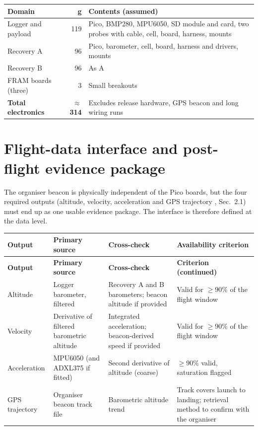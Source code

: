 \small
{}
\begin{tabularx}{\linewidth}{@{}L{44mm}r Y@{}}
\toprule{}\textbf{Domain}&\textbf{g}&\textbf{Contents (assumed)}\\\midrule
Logger and payload & 119 & Pico, BMP280, MPU6050, SD module and card, two probes with cable, cell, board, harness, mounts\\
Recovery A & 96 & Pico, barometer, cell, board, harness and drivers, mounts\\
Recovery B & 96 & As A\\
FRAM boards (three) & 3 & Small breakouts\\
\midrule
\textbf{Total electronics} & \textbf{$\approx$314} & Excludes release hardware, GPS beacon and long wiring runs\\
\bottomrule
\end{tabularx}
\normalsize

\section{Flight-data interface and post-flight evidence package}
\label{sec:dataflow}
The organiser beacon is physically independent of the Pico boards, but the four required outputs (altitude, velocity, acceleration and GPS trajectory \cite{rtc2027app03}, Sec.~2.1) must end up as one usable evidence package. The interface is therefore defined at the data level.

\small
{}
\begin{longtable}{@{}L{24mm}L{40mm}L{42mm}L{40mm}@{}}
\toprule{}\textbf{Output}&\textbf{Primary source}&\textbf{Cross-check}&\textbf{Availability criterion}\\\midrule\endfirsthead
\toprule{}\textbf{Output}&\textbf{Primary source}&\textbf{Cross-check}&\textbf{Criterion (continued)}\\\midrule\endhead
\bottomrule\endlastfoot
Altitude & Logger barometer, filtered & Recovery A and B barometers; beacon altitude if provided & Valid for $\ge90\%$ of the flight window\\
Velocity & Derivative of filtered barometric altitude & Integrated acceleration; beacon-derived speed if provided & Valid for $\ge90\%$ of the flight window\\
Acceleration & MPU6050 (and ADXL375 if fitted) & Second derivative of altitude (coarse) & $\ge90\%$ valid, saturation flagged\\
GPS trajectory & Organiser beacon track file & Barometric altitude trend & Track covers launch to landing; retrieval method to confirm with the organiser\\
\end{longtable}
\normalsize

